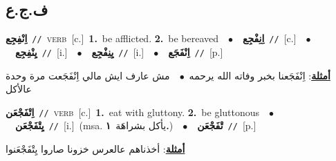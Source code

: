 \documentclass[10pt,a4paper,twoside]{article} %
\begin{document}
\begin{multicols}{2}
{{{{{{{{{{{\vspace{-3mm}
\subsection*{\color{blue}\foreignlanguage{arabic}{ف.ج.ع}\color{blue}{}} 

{\setlength\topsep{0pt}\textbf{\foreignlanguage{arabic}{اِنْفِجِع}}\ {\color{gray}\texttt{//}\color{black}}\ \textsc{verb}\ [c.]\ \textbf{1.}~be afflicted.  \textbf{2.}~be bereaved\ \ $\bullet$\ \ \setlength\topsep{0pt}\textbf{\foreignlanguage{arabic}{اِنِفْجِع}}\ {\color{gray}\texttt{//}\color{black}}\ [c.]\ \ $\bullet$\ \ \setlength\topsep{0pt}\textbf{\foreignlanguage{arabic}{يِنْفِجِع}}\ {\color{gray}\texttt{//}\color{black}}\ [i.]\ \ $\bullet$\ \ \setlength\topsep{0pt}\textbf{\foreignlanguage{arabic}{يِنِفْجِع}}\ {\color{gray}\texttt{//}\color{black}}\ [i.]\ \ $\bullet$\ \ \setlength\topsep{0pt}\textbf{\foreignlanguage{arabic}{اِنْفَجَع}}\ {\color{gray}\texttt{//}\color{black}}\ [p.]\  \begin{flushright}\color{gray}\foreignlanguage{arabic}{\textbf{\underline{\foreignlanguage{arabic}{أمثلة}}}: اِنْفَجَعنا بخبر وفاته الله يرحمه\ $\bullet$\ \  مش عارف ايش مالي اِنْفَجَعت مرة وحدة عالأكل}\end{flushright}\color{black}} \vspace{2mm}

{\setlength\topsep{0pt}\textbf{\foreignlanguage{arabic}{اِتْفَجْعَن}}\ {\color{gray}\texttt{//}\color{black}}\ \textsc{verb}\ [c.]\ \textbf{1.}~eat with gluttony.  \textbf{2.}~be gluttonous\ \ $\bullet$\ \ \setlength\topsep{0pt}\textbf{\foreignlanguage{arabic}{يِتْفَجْعَن}}\ {\color{gray}\texttt{//}\color{black}}\ [i.]\ \color{gray}(msa. \foreignlanguage{arabic}{يأكل بشراهَة}~\foreignlanguage{arabic}{\textbf{١.}})\color{black}\ \ $\bullet$\ \ \setlength\topsep{0pt}\textbf{\foreignlanguage{arabic}{تْفَجْعَن}}\ {\color{gray}\texttt{//}\color{black}}\ [p.]\  \begin{flushright}\color{gray}\foreignlanguage{arabic}{\textbf{\underline{\foreignlanguage{arabic}{أمثلة}}}: أخذناهم عالعرس خزونا صاروا يِتْفَجْعَنوا}\end{flushright}\color{black}} \vspace{2mm}

}}}}}}}}}}}
\end{multicols}
\end{document}

